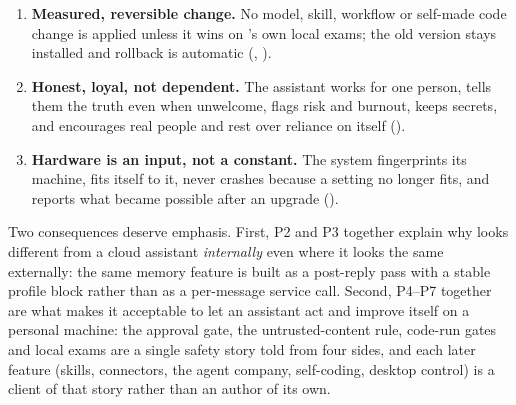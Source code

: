 \begin{enumerate}[label=\textbf{P\arabic*}]
\item \textbf{Measured, reversible change.} No model, skill, workflow or self-made code change is applied unless it wins on \hivi{}'s own local exams; the old version stays installed and rollback is automatic (, ).

\item \textbf{Honest, loyal, not dependent.} The assistant works for one person, tells them the truth even when unwelcome, flags risk and burnout, keeps secrets, and encourages real people and rest over reliance on itself ().

\item \textbf{Hardware is an input, not a constant.} The system fingerprints its machine, fits itself to it, never crashes because a setting no longer fits, and reports what became possible after an upgrade ().
\end{enumerate}

Two consequences deserve emphasis. First, P2 and P3 together explain why \hivi{} looks different from a cloud assistant \emph{internally} even where it looks the same externally: the same memory feature is built as a post-reply pass with a stable profile block rather than as a per-message service call. Second, P4--P7 together are what makes it acceptable to let an assistant act and improve itself on a personal machine: the approval gate, the untrusted-content rule, code-run gates and local exams are a single safety story told from four sides, and each later feature (skills, connectors, the agent company, self-coding, desktop control) is a client of that story rather than an author of its own.
